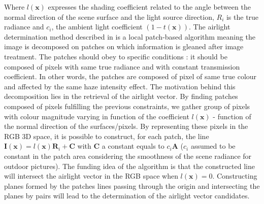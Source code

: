 \documentclass[conference]{IEEEtran}
\begin{document}
Where $l(\mathbf{x})$ expresses the shading coefficient related to the angle between the normal direction of the scene surface and
the light source direction, $R_i$ is the true radiance and $c_i$, the ambient light coefficient $(1-t(\mathbf{x}))$.
The airlight determination method described in \cite{airlight} is a local patch-based algorithm meaning the image is decomposed on patches on which information is
gleaned after image treatment.  The patches should obey to specific conditions : it should be composed of pixels with same
true radiance and with constant transmission coefficient. In other words, the patches are composed of pixel of same true colour and affected
by the same haze intensity effect. The motivation behind this decomposition lies in the retrieval of the airlight
vector.  By finding patches composed of pixels fulfilling the previous constraints, we gather group of pixels with colour magnitude
varying in function of the coefficient $l(\mathbf{x})$ - function of the normal direction of the surfaces/pixels.  By representing these pixels in the RGB 3D space, it is possible to construct, for each patch, the line $\mathbf{I}(\mathbf{x}) = l(\mathbf{x}) \mathbf{R}_i + \mathbf{C}$ 
with $\mathbf{C}$ a constant equals to $c_i \mathbf{A}$ ($c_i$ assumed to be constant in the patch area considering the smoothness of the scene radiance for outdoor pictures).
The funding idea of the algorithm is that the constructed line will intersect the airlight vector in the RGB space when $l(\mathbf{x}) = 0$.
Constructing planes formed by the patches lines passing through the origin and intersecting the planes by pairs will lead to the
determination of the airlight vector candidates.
\end{document}
